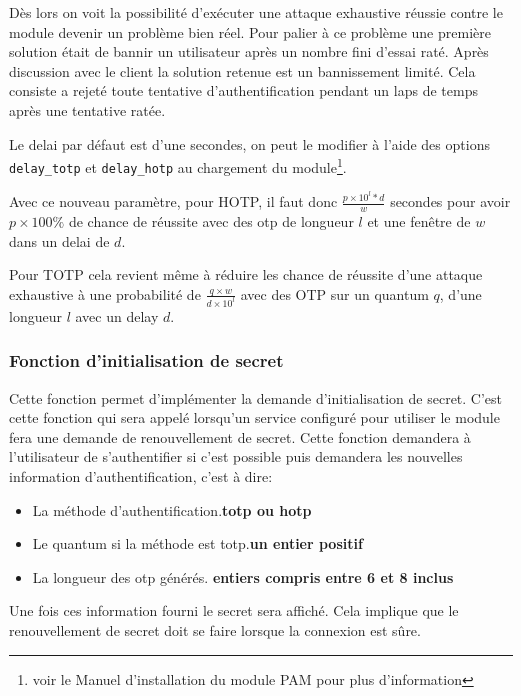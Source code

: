 Dès lors on voit la possibilité d'exécuter une attaque exhaustive réussie contre
le module devenir un problème bien réel. Pour palier à ce problème une première
solution était de bannir un utilisateur après un nombre fini d'essai raté. Après
discussion avec le client la solution retenue est un bannissement limité. Cela
consiste a rejeté toute tentative d'authentification pendant un laps de temps
après une tentative ratée.

Le delai par défaut est d'une secondes, on peut le modifier à l'aide des options
\verb?delay_totp? et \verb?delay_hotp? au chargement du module\footnote{voir le
Manuel d'installation du module PAM pour plus d'information}.

Avec ce nouveau paramètre, pour HOTP, il faut donc $\frac{p\times10^{l}*d}{w}$
secondes pour avoir $p\times100\%$ de chance de réussite avec des otp de
longueur $l$ et une fenêtre de $w$ dans un delai de $d$.

Pour TOTP cela revient même à réduire les chance de réussite d'une attaque
exhaustive à une probabilité de $\frac{q\times w}{d\times10^{l}}$ avec des OTP
sur un quantum $q$, d'une longueur $l$ avec un delay $d$.

\subsubsection{Fonction d'initialisation de secret}
Cette fonction permet d'implémenter la demande d'initialisation de secret.
C'est cette fonction qui sera appelé lorsqu'un service configuré pour utiliser
le module fera une demande de renouvellement de secret. Cette fonction demandera
à l'utilisateur de s'authentifier si c'est possible puis demandera les nouvelles
information d'authentification, c'est à dire:
\begin{itemize}
  \item La méthode d'authentification.\hfill\textbf{totp ou hotp}
  \item Le quantum si la méthode est totp.\hfill \textbf{un entier positif}
  \item La longueur des otp générés.
  \hfill\textbf{entiers compris entre 6 et 8 inclus}
\end{itemize}
Une fois ces information fourni le secret sera affiché. Cela implique que le
renouvellement de secret doit se faire lorsque la connexion est sûre.


\newpage
